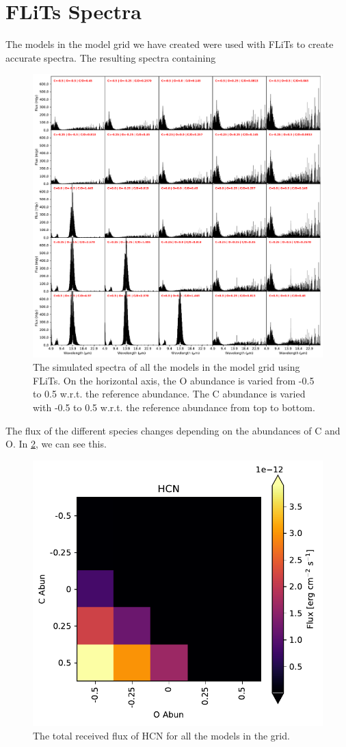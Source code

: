 \documentclass[twoside, single, authoryear, semicolon]{lion-msc}
\newcommand{\4}{$_4$}
\newcommand{\3}{$_3$}
\newcommand{\2}{$_2$}
\begin{document}
\section{FLiTs Spectra}
The models in the model grid we have created were used with FLiTs to create accurate spectra. The resulting spectra containing 
\begin{figure}[!h]
    \centering
    \includegraphics[width=\linewidth]{Figures/All_spectra.pdf}
    \caption{The simulated spectra of all the models in the model grid using FLiTs. On the horizontal axis, the O abundance is varied from -0.5 to 0.5 w.r.t. the reference abundance. The C abundance is varied with -0.5 to 0.5 w.r.t. the reference abundance from top to bottom.}
    \label{fig:all spectra}
\end{figure}
The flux of the different species changes depending on the abundances of C and O. In \ref{fig:flux HCN}, we can see this.
\begin{figure}[!ht]
    \centering
    \includegraphics[width=0.5\linewidth]{Figures/HCN_heatmap.pdf}
    \caption{The total received flux of HCN for all the models in the grid.}
    \label{fig:flux HCN}
\end{figure}
\end{document}
